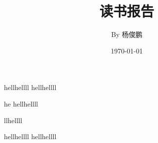 \documentclass[UTF8, 12pt, a4paper]{ctexart}%
\title{读书报告}
\author{By 杨俊鹏}
\date{\today}
\begin{document}
\maketitle
hellhellll
hellhellll

he
hellhellll

llhellll

hellhellll
hellhellll
\end{document}

